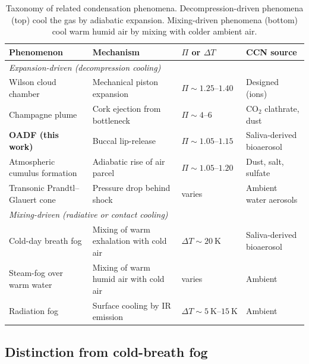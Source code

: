 \documentclass[11pt,a4paper]{article}
\theoremstyle{definition}
\theoremstyle{plain}
\begin{document}
\begin{table}[h]
\centering
\footnotesize
\caption{\label{tab:taxonomy}Taxonomy of related condensation phenomena. Decompression-driven phenomena (top) cool the gas by adiabatic expansion. Mixing-driven phenomena (bottom) cool warm humid air by mixing with colder ambient air.}
\begin{tabularx}{\textwidth}{@{}lXll@{}}
\toprule
\textbf{Phenomenon} & \textbf{Mechanism} & \textbf{$\Pi$ or $\Delta T$} & \textbf{CCN source} \\
\midrule
\multicolumn{4}{l}{\emph{Expansion-driven (decompression cooling)}} \\
Wilson cloud chamber                 & Mechanical piston expansion         & $\Pi \sim 1.25\text{--}1.40$ & Designed (ions) \\
Champagne plume                      & Cork ejection from bottleneck       & $\Pi \sim 4\text{--}6$       & CO$_2$ clathrate, dust \\
\textbf{OADF (this work)}            & Buccal lip-release                  & $\Pi \sim 1.05\text{--}1.15$ & Saliva-derived bioaerosol \\
Atmospheric cumulus formation        & Adiabatic rise of air parcel        & $\Pi \sim 1.05\text{--}1.20$ & Dust, salt, sulfate \\
Transonic Prandtl–Glauert cone       & Pressure drop behind shock          & varies                       & Ambient water aerosols \\
\midrule
\multicolumn{4}{l}{\emph{Mixing-driven (radiative or contact cooling)}} \\
Cold-day breath fog                  & Mixing of warm exhalation with cold air & $\Delta T \sim \SI{20}{\kelvin}$ & Saliva-derived bioaerosol \\
Steam-fog over warm water            & Mixing of warm humid air with cold air & varies                    & Ambient \\
Radiation fog                        & Surface cooling by IR emission         & $\Delta T \sim \SIrange{5}{15}{\kelvin}$ & Ambient \\
\bottomrule
\end{tabularx}
\end{table}

\subsection{Distinction from cold-breath fog}
\label{sec:mixingfog}
\end{document}
